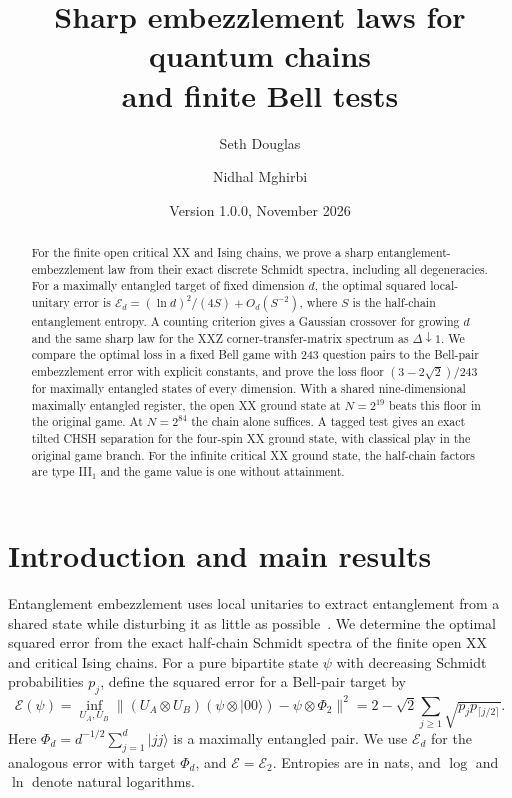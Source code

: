 \documentclass[10pt,a4paper]{article}
\title{\vspace{-1.8cm}\bfseries Sharp embezzlement laws for quantum chains\\ and finite Bell tests}
\author{Seth Douglas \and Nidhal Mghirbi}
\date{\small Version 1.0.0, November 2026}
\theoremstyle{remark}
\newcommand{\cE}{\mathcal{E}}
\begin{document}
\maketitle
\vspace{-2.2em}
\begin{abstract}
\noindent
For the finite open critical XX and Ising chains, we prove a sharp
entanglement-embezzlement law from their exact discrete Schmidt spectra,
including all degeneracies.
For a maximally entangled target of fixed dimension $d$, the optimal
squared local-unitary error is $\mathcal E_d=(\ln d)^2/(4S)+O_d(S^{-2})$,
where $S$ is the half-chain entanglement entropy. A counting criterion
gives a Gaussian crossover for growing $d$ and the same sharp law for the
XXZ corner-transfer-matrix spectrum as $\Delta\downarrow1$.
We compare the optimal loss in a fixed Bell game with 243
question pairs to the Bell-pair embezzlement error with explicit constants,
and prove the loss floor
$(3-2\sqrt2)/243$ for maximally entangled states of every dimension.
With a shared nine-dimensional maximally entangled register, the open XX
ground state at $N=2^{19}$ beats this floor in the original game.
At $N=2^{84}$ the chain alone suffices.
A tagged test gives an exact tilted CHSH
separation for the four-spin XX ground state, with classical play in the
original game branch. For the infinite critical XX ground state, the
half-chain factors are type III$_1$ and the game value is one without
attainment.
\end{abstract}

\section{Introduction and main results}\label{sec:intro}

Entanglement embezzlement uses local unitaries to extract entanglement from
a shared state while disturbing it as little as possible~\cite{vDH03}.
We determine the optimal squared error from the exact half-chain Schmidt
spectra of the finite open XX and critical Ising chains.
For a pure bipartite state $\psi$ with decreasing Schmidt probabilities $p_j$,
define the squared error for a Bell-pair target by
\begin{equation}\label{eq:E}
\cE(\psi)=\inf_{U_A,U_B}
\bigl\|(U_A\otimes U_B)(\psi\otimes|00\rangle)-\psi\otimes\Phi_2\bigr\|^2
=2-\sqrt2\sum_{j\ge1}\sqrt{p_jp_{\lceil j/2\rceil}}.
\end{equation}
Here $\Phi_d=d^{-1/2}\sum_{j=1}^d|jj\rangle$ is a maximally entangled pair.
We use $\cE_d$ for the analogous error with target $\Phi_d$, and $\cE=\cE_2$.
Entropies are in nats, and $\log$ and $\ln$ denote natural logarithms.
\end{document}
